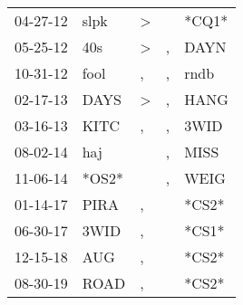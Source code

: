 \begin{supertabular}{p{0.07\textwidth}p{0.06\textwidth}p{0.02\textwidth}p{0.02\textwidth}p{0.06\textwidth}}
 04-27-12\textsuperscript{} &  slpk\textsuperscript{} &  \textgreater &    &                   *CQ1* \\
 05-25-12\textsuperscript{} &   40s\textsuperscript{} &  \textgreater &  , &  DAYN\textsuperscript{} \\
 10-31-12\textsuperscript{} &  fool\textsuperscript{} &             , &  , &  rndb\textsuperscript{} \\
 02-17-13\textsuperscript{} &  DAYS\textsuperscript{} &  \textgreater &  , &  HANG\textsuperscript{} \\
 03-16-13\textsuperscript{} &  KITC\textsuperscript{} &             , &  , &  3WID\textsuperscript{} \\
 08-02-14\textsuperscript{} &   haj\textsuperscript{} &               &  , &  MISS\textsuperscript{} \\
 11-06-14\textsuperscript{} &                   *OS2* &               &  , &  WEIG\textsuperscript{} \\
 01-14-17\textsuperscript{} &  PIRA\textsuperscript{} &             , &    &                   *CS2* \\
 06-30-17\textsuperscript{} &  3WID\textsuperscript{} &             , &    &                   *CS1* \\
 12-15-18\textsuperscript{} &   AUG\textsuperscript{} &             , &    &                   *CS2* \\
 08-30-19\textsuperscript{} &  ROAD\textsuperscript{} &             , &    &                   *CS2* \\
\end{supertabular}
